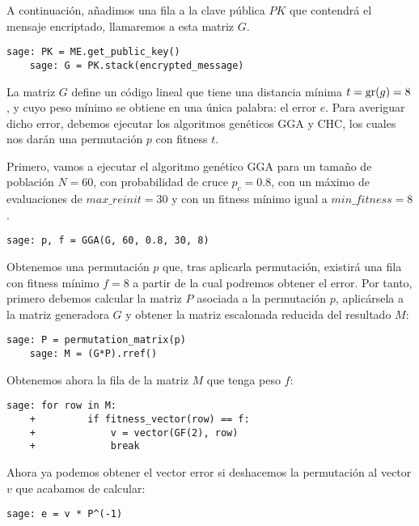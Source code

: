 \begin{exampleth}
    A continuación, añadimos una fila a la clave pública $PK$ que contendrá el mensaje encriptado, llamaremos a esta matriz $G$.

    \begin{lstlisting}[gobble=4]
    sage: PK = ME.get_public_key()
    sage: G = PK.stack(encrypted_message)
    \end{lstlisting}

    La matriz $G$ define un código lineal que tiene una distancia mínima $t = \operatorname{gr}(g) = 8$, y cuyo peso mínimo se obtiene en una única palabra: el error $e$. Para averiguar dicho error, debemos ejecutar los algoritmos genéticos GGA y CHC, los cuales nos darán una permutación $p$ con fitness $t$.

    Primero, vamos a ejecutar el algoritmo genético GGA para un tamaño de población $N = 60$, con probabilidad de cruce $p_c = 0.8$, con un máximo de evaluaciones de $max\_reinit = 30$ y con un fitness mínimo igual a $min\_fitness = 8$. 
    
    \begin{lstlisting}[gobble=4]
    sage: p, f = GGA(G, 60, 0.8, 30, 8)
    \end{lstlisting}

    Obtenemos una permutación $p$ que, tras aplicarla permutación, existirá una fila con fitness mínimo $f = 8$ a partir de la cual podremos obtener el error. Por tanto, primero debemos calcular la matriz $P$ asociada a la permutación $p$, aplicársela a la matriz generadora $G$ y obtener la matriz escalonada reducida del resultado $M$:

    \begin{lstlisting}[gobble=4]
    sage: P = permutation_matrix(p)
    sage: M = (G*P).rref()
    \end{lstlisting}

    Obtenemos ahora la fila de la matriz $M$ que tenga peso $f$:

    \begin{lstlisting}[gobble=4]
    sage: for row in M:
    +         if fitness_vector(row) == f:
    +             v = vector(GF(2), row)
    +             break
    \end{lstlisting}
    
    Ahora ya podemos obtener el vector error si deshacemos la permutación al vector $v$ que acabamos de calcular:

    \begin{lstlisting}[gobble=4]
    sage: e = v * P^(-1)
    \end{lstlisting}


\end{exampleth}
